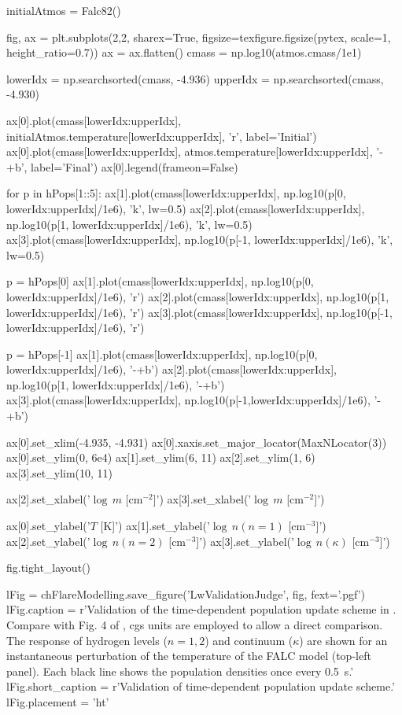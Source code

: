 \begin{pycode}[FlareModelling]
initialAtmos = Falc82()

fig, ax = plt.subplots(2,2, sharex=True, figsize=texfigure.figsize(pytex, scale=1, height_ratio=0.7))
ax = ax.flatten()
cmass = np.log10(atmos.cmass/1e1)

lowerIdx = np.searchsorted(cmass, -4.936)
upperIdx = np.searchsorted(cmass, -4.930)

ax[0].plot(cmass[lowerIdx:upperIdx], initialAtmos.temperature[lowerIdx:upperIdx], 'r', label='Initial')
ax[0].plot(cmass[lowerIdx:upperIdx], atmos.temperature[lowerIdx:upperIdx], '-+b', label='Final')
ax[0].legend(frameon=False)

for p in hPops[1::5]:
    ax[1].plot(cmass[lowerIdx:upperIdx], np.log10(p[0, lowerIdx:upperIdx]/1e6), 'k', lw=0.5)
    ax[2].plot(cmass[lowerIdx:upperIdx], np.log10(p[1, lowerIdx:upperIdx]/1e6), 'k', lw=0.5)
    ax[3].plot(cmass[lowerIdx:upperIdx], np.log10(p[-1, lowerIdx:upperIdx]/1e6), 'k', lw=0.5)

p = hPops[0]
ax[1].plot(cmass[lowerIdx:upperIdx], np.log10(p[0, lowerIdx:upperIdx]/1e6), 'r')
ax[2].plot(cmass[lowerIdx:upperIdx], np.log10(p[1, lowerIdx:upperIdx]/1e6), 'r')
ax[3].plot(cmass[lowerIdx:upperIdx], np.log10(p[-1, lowerIdx:upperIdx]/1e6), 'r')

p = hPops[-1]
ax[1].plot(cmass[lowerIdx:upperIdx], np.log10(p[0, lowerIdx:upperIdx]/1e6),  '-+b')
ax[2].plot(cmass[lowerIdx:upperIdx], np.log10(p[1, lowerIdx:upperIdx]/1e6),  '-+b')
ax[3].plot(cmass[lowerIdx:upperIdx], np.log10(p[-1,lowerIdx:upperIdx]/1e6), '-+b')

ax[0].set_xlim(-4.935, -4.931)
ax[0].xaxis.set_major_locator(MaxNLocator(3))
ax[0].set_ylim(0, 6e4)
ax[1].set_ylim(6, 11)
ax[2].set_ylim(1, 6)
ax[3].set_ylim(10, 11)

ax[2].set_xlabel('$\log\,m$ [cm$^{-2}$]')
ax[3].set_xlabel('$\log\,m$ [cm$^{-2}$]')

ax[0].set_ylabel('$T$ [K]')
ax[1].set_ylabel('$\log\,n(n=1)$ [cm$^{-3}$]')
ax[2].set_ylabel('$\log\,n(n=2)$ [cm$^{-3}$]')
ax[3].set_ylabel('$\log\,n(\kappa)$ [cm$^{-3}$]')

fig.tight_layout()

lFig = chFlareModelling.save_figure('LwValidationJudge', fig, fext='.pgf')
lFig.caption = r'Validation of the time-dependent population update scheme in \Lw{}. Compare with Fig. 4 of \citet{Judge2017}, cgs units are employed to allow a direct comparison. The response of hydrogen levels ($n=1, 2$) and continuum ($\kappa$) are shown for an instantaneous perturbation of the temperature of the FALC model (top-left panel). Each black line shows the population densities once every \SI{0.5}{\second}.'
lFig.short_caption = r'Validation of \Lw{} time-dependent population update scheme.'
lFig.placement = 'ht'
\end{pycode}

